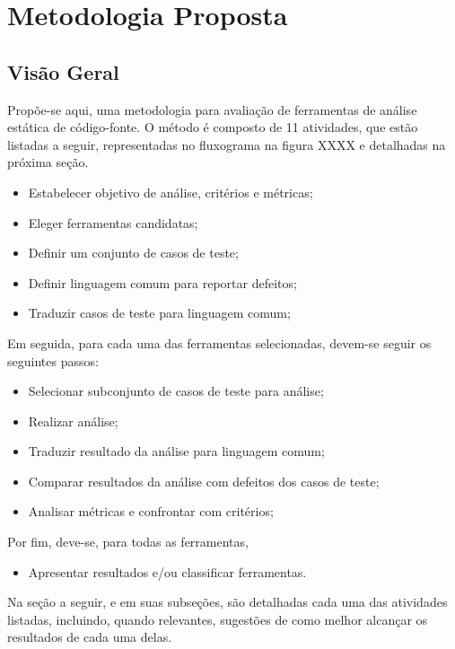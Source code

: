\chapter{Metodologia Proposta}\label{metodologia_proposta}

\section{Visão Geral}\label{metodologia_proposta:visao_geral}

Propõe-se aqui, uma metodologia para avaliação de ferramentas de análise estática de código-fonte. O método é composto de 11 atividades, que estão listadas a seguir, representadas no fluxograma na figura XXXX e detalhadas na próxima seção.

\begin{itemize}
  \item Estabelecer objetivo de análise, critérios e métricas;
  \item Eleger ferramentas candidatas;
  \item Definir um conjunto de casos de teste;
  \item Definir linguagem comum para reportar defeitos;
  \item Traduzir casos de teste para linguagem comum;
\end{itemize}

Em seguida, para cada uma das ferramentas selecionadas, devem-se seguir os seguintes passos:

\begin{itemize}
  \item Selecionar subconjunto de casos de teste para análise;
  \item Realizar análise;
  \item Traduzir resultado da análise para linguagem comum;
  \item Comparar resultados da análise com defeitos dos casos de  teste;
  \item Analisar métricas e confrontar com critérios;
\end{itemize}

Por fim, deve-se, para todas as ferramentas,
\begin{itemize}
  \item Apresentar resultados e/ou classificar ferramentas.
\end{itemize}


Na seção a seguir,  e em suas subseções, são detalhadas cada uma das atividades listadas, incluindo, quando relevantes, sugestões de como melhor alcançar os resultados de cada uma delas.

